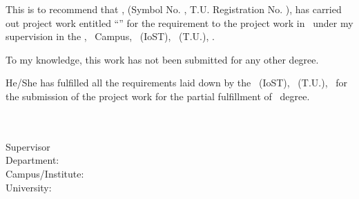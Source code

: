 
This is to recommend that \textbf{\ReportAuthor}, (Symbol No. \SymbolNumber, T.U.
Registration No. \RegistrationNumber), has carried out project work entitled ``\textbf{\ReportTitle}'' for the
requirement to the project work in \ProgramName\ 
under my supervision in the \DepartmentName, \CampusName\ Campus, \InstituteName\ (IoST),
\UniversityName\ (T.U.), \CountryName.

To my knowledge, this work has not been submitted for any other degree.

He/She has fulfilled all the requirements laid down by the \InstituteName\ (IoST), \UniversityName\ (T.U.),
\CountryName\ for the submission of the project work for the partial fulfillment of
\ProgramName\ degree.

\vspace{2\baselineskip}
\DashedSignatureLine{5cm}\\
\SupervisorName \\
Supervisor\\
Department: \SupervisorDepartment\\
Campus/Institute: \SupervisorCampus\\
University: \SupervisorUniversity\\

\vfill
\begin{center}
  \bfseries\fontsize{14}{16}\selectfont [\SubmissionDate]
\end{center}
